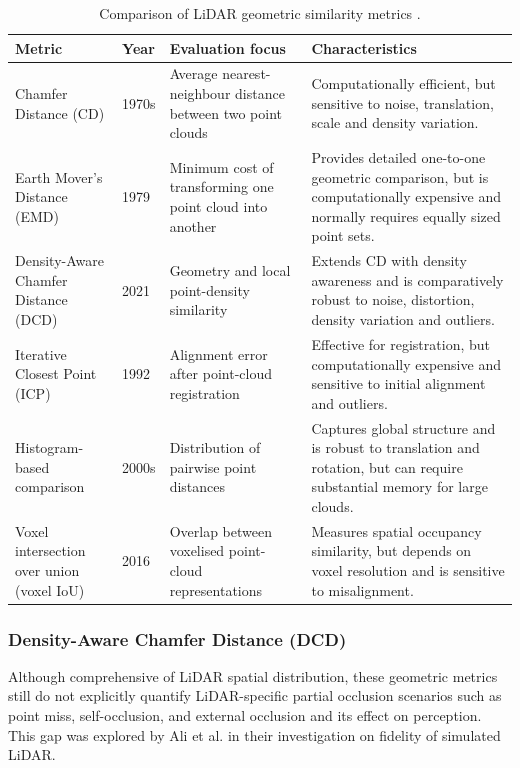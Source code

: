 \documentclass[12pt,a4paper]{article}
\begin{document}
\begin{table}[htbp]
    \centering
    \caption{Comparison of LiDAR geometric similarity metrics \cite{bib_ref_4}.}
    \label{tab:lidar-geometric-metrics}
    \small
    \setlength{\tabcolsep}{3pt}
    \sloppy
    \renewcommand{\arraystretch}{1.15}
    \begin{tabularx}{\textwidth}{|p{2.7cm}|p{1.1cm}|p{3.4cm}|Y|}
        \hline
        \textbf{Metric} & \textbf{Year} & \textbf{Evaluation focus} & \textbf{Characteristics} \\
        \hline
        Chamfer Distance (CD) & 1970s & Average nearest-neighbour distance between two point clouds & Computationally efficient, but sensitive to noise, translation, scale and density variation. \\
        \hline
        Earth Mover's Distance (EMD) & 1979 & Minimum cost of transforming one point cloud into another & Provides detailed one-to-one geometric comparison, but is computationally expensive and normally requires equally sized point sets. \\
        \hline
        Density-Aware Chamfer Distance (DCD) & 2021 & Geometry and local point-density similarity & Extends CD with density awareness and is comparatively robust to noise, distortion, density variation and outliers. \\
        \hline
        Iterative Closest Point (ICP) & 1992 & Alignment error after point-cloud registration & Effective for registration, but computationally expensive and sensitive to initial alignment and outliers. \\
        \hline
        Histogram-based comparison & 2000s & Distribution of pairwise point distances & Captures global structure and is robust to translation and rotation, but can require substantial memory for large clouds. \\
        \hline
        Voxel intersection over union (voxel IoU) & 2016 & Overlap between voxelised point-cloud representations & Measures spatial occupancy similarity, but depends on voxel resolution and is sensitive to misalignment. \\
        \hline
    \end{tabularx}
\end{table}

\subsubsection{Density-Aware Chamfer Distance (DCD)}

Although comprehensive of LiDAR spatial distribution, these geometric
metrics still do not explicitly quantify LiDAR-specific partial
occlusion scenarios such as point miss, self-occlusion, and external
occlusion and its effect on perception. This gap was explored by Ali et
al. \cite{bib_ref_4} in their investigation on fidelity of
simulated LiDAR.
\end{document}

